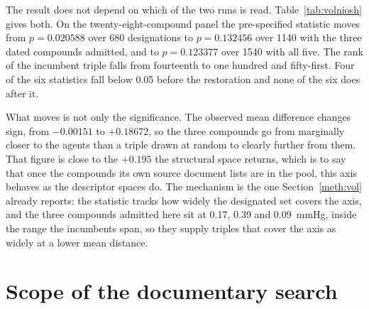 \documentclass[11pt,a4paper]{article}
\begin{document}
The result does not depend on which of the two runs is read.
Table~\ref{tab:volniosh} gives both. On the twenty-eight-compound panel the
pre-specified statistic moves from $p = 0.020588$ over 680 designations to
$p = 0.132456$ over 1140 with the three dated compounds admitted, and to
$p = 0.123377$ over 1540 with all five. The rank of the incumbent triple falls
from fourteenth to one hundred and fifty-first. Four of the six statistics fall
below 0.05 before the restoration and none of the six does after it.

What moves is not only the significance. The observed mean difference changes
sign, from $-0.00151$ to $+0.18672$, so the three compounds go from marginally
closer to the agents than a triple drawn at random to clearly further from
them. That figure is close to the $+0.195$ the structural space returns, which
is to say that once the compounds its own source document lists are in the
pool, this axis behaves as the descriptor spaces do. The mechanism is the one
Section~\ref{meth:vol} already reports: the statistic tracks how widely the
designated set covers the axis, and the three compounds admitted here sit at
0.17, 0.39 and 0.09~mmHg, inside the range the incumbents span, so they supply
triples that cover the axis as widely at a lower mean distance.



\section{Scope of the documentary search}
\label{res:searchscope}


\end{document}
